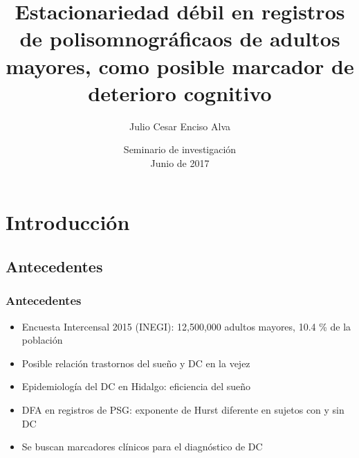 \documentclass{beamer}
\title[Estacionariedad en PSG de adultos mayores]
{Estacionariedad d\'ebil en registros de polisomnogr\'aficaos de adultos mayores,
como posible marcador de deterioro cognitivo}
\author[Enciso Alva]
{Julio Cesar Enciso Alva}
\institute[LIMA]
{Licenciatura en Matem\'aticas Aplicadas}
\date[Junio 2017]
{Seminario de investigaci\'on\\ Junio de 2017}
\begin{document}
\frame{\titlepage}



\section{Introducci\'on}


\subsection{Antecedentes}

\begin{frame}\frametitle{Antecedentes}
\begin{itemize}
\item Encuesta Intercensal 2015 (INEGI): 12,500,000 adultos mayores, 10.4 \%  de la 
poblaci\'on %

\item Posible relaci\'on trastornos del sue\~no y DC en la vejez

\item Epidemiolog\'ia del DC en Hidalgo: eficiencia del sue\~no%

\item DFA en registros de PSG:%
exponente de Hurst diferente en sujetos 
con y sin DC 

\item Se buscan marcadores cl\'inicos para el diagn\'ostico de DC
\end{itemize}
\end{frame}


\end{document}
